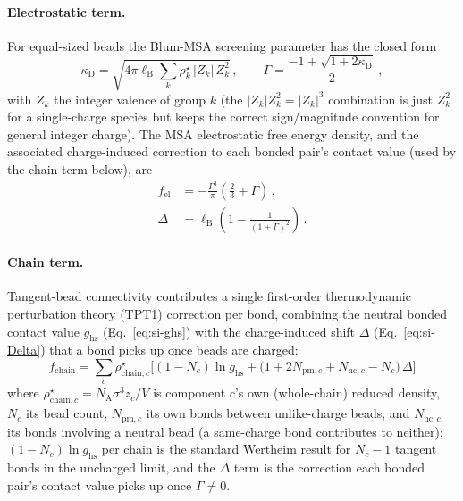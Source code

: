 \documentclass[journal=macl,manuscript=suppinfo,layout=onecolumn]{achemso}
\begin{document}
\paragraph{Electrostatic term.}
For equal-sized beads the Blum-MSA screening parameter\cite{blumMeanSphericalModel1975} has the closed form 
\begin{equation}
    \kappa_\mathrm{D} = \sqrt{4\pi\ell_\mathrm{B}\sum_k \rho^\star_k\,|Z_k|\,Z_k^2}\,,\qquad
    \Gamma = \frac{-1+\sqrt{1+2\kappa_\mathrm{D}}}{2}\,,
    \label{eq:si-GammaMSA}
\end{equation}
with $Z_k$ the integer valence of group $k$ (the $|Z_k|Z_k^2=|Z_k|^3$ combination is just $Z_k^2$ for a single-charge species but keeps the correct sign/magnitude convention for general integer charge). The MSA electrostatic free energy density, and the associated charge-induced correction to each bonded pair's contact value (used by the chain term below), are
\begin{align}
    f_\mathrm{el} &= -\frac{\Gamma^3}{\pi}\left(\frac{2}{3}+\Gamma\right)\,, \label{eq:si-fel}\\
    \Delta &= \ell_\mathrm{B}\left(1-\frac{1}{(1+\Gamma)^2}\right)\,. \label{eq:si-Delta}
\end{align}

\paragraph{Chain term.}
Tangent-bead connectivity contributes a single first-order thermodynamic perturbation theory (TPT1) correction per bond\cite{wertheimFluidsHighlyDirectional1984,wertheimFluidsHighlyDirectional1984a,wertheimFluidsHighlyDirectional1986,wertheimFluidsHighlyDirectional1986a}, combining the neutral bonded contact value $g_\mathrm{hs}$ (Eq.~\ref{eq:si-ghs}) with the charge-induced shift $\Delta$ (Eq.~\ref{eq:si-Delta}) that a bond picks up once beads are charged:
\begin{equation}
    f_\mathrm{chain} = \sum_c \rho^\star_{\mathrm{chain},c}\Big[(1-N_c)\ln g_\mathrm{hs} + \big(1+2N_{\mathrm{pm},c}+N_{\mathrm{nc},c}-N_c\big)\,\Delta\Big]
    \label{eq:si-fchain}
\end{equation}
where $\rho^\star_{\mathrm{chain},c}=N_\mathrm{A}\sigma^3 z_c/V$ is component $c$'s own (whole-chain) reduced density, $N_c$ its bead count, $N_{\mathrm{pm},c}$ its own bonds between unlike-charge beads, and $N_{\mathrm{nc},c}$ its bonds involving a neutral bead (a same-charge bond contributes to neither); $(1-N_c)\ln g_\mathrm{hs}$ per chain is the standard Wertheim result for $N_c-1$ tangent bonds in the uncharged limit, and the $\Delta$ term is the correction each bonded pair's contact value picks up once $\Gamma\neq0$.
\end{document}
